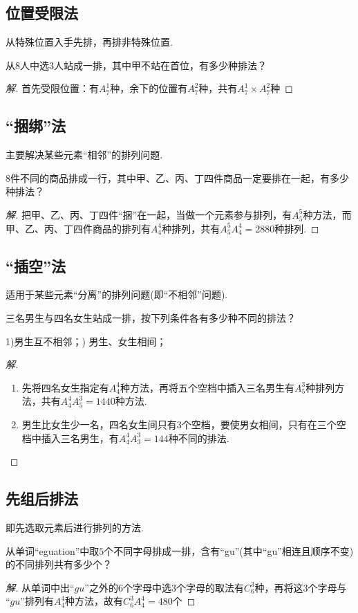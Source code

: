 \documentclass[marginline,noindent,answers,adobefonts]{BHCexam}
\begin{document}
\subsection{位置受限法}
 从特殊位置入手先排，再排非特殊位置.\par
\begin{example}
从$8$人中选$3$人站成一排，其中甲不站在首位，有多少种排法？
\end{example}
\begin{proof}[解]
首先受限位置：有$A_7^1$种，余下的位置有$ A_7^2 $种，共有$ A_7^1\times A_7^2 $种
\end{proof}
\subsection{“捆绑”法}
主要解决某些元素“相邻”的排列问题.\par
\begin{example}
$ 8 $件不同的商品排成一行，其中甲、乙、丙、丁四件商品一定要排在一起，有多少种排法？
\end{example}
\begin{proof}[解]
把甲、乙、丙、丁四件“捆”在一起，当做一个元素参与排列，有$ A_5^5 $种方法，而甲、乙、丙、丁四件商品的排列有$ A_4^4 $种排列，共有$ A_5^5A_4^4=2880 $种排列.
\end{proof}
\subsection{“插空”法}
适用于某些元素“分离”的排列问题(即“不相邻”问题).\par 
\begin{example}
三名男生与四名女生站成一排，按下列条件各有多少种不同的排法？\par
1)男生互不相邻；) 男生、女生相间；
\end{example}
\begin{proof}[解]
\begin{enumerate}[1)]
\item 先将四名女生指定有$ A_4^4 $种方法，再将五个空档中插入三名男生有$ A_5^3 $种排列方法，共有$ A_4^4A_5^3 =1440$种方法.
\item 男生比女生少一名，四名女生间只有$3$个空档，要使男女相间，只有在三个空档中插入三名男生，有$ A_4^4A_3^3 =144$种不同的排法.
\end{enumerate}
\end{proof}
\subsection{先组后排法}
即先选取元素后进行排列的方法.\par
\begin{example}
从单词“eguation”中取$ 5 $个不同字母排成一排，含有“gu”(其中“gu”相连且顺序不变)的不同排列共有多少个？
\end{example}
\begin{proof}[解]
从单词中出$ “gu” $之外的$ 6 $个字母中选$ 3 $个字母的取法有$ C_6^3 $种，再将这$ 3 $个字母与$ “gu” $排列有$ A_4^4 $种方法，故有$ C_6^3A_4^4=480 $个
\end{proof}
\end{document}
